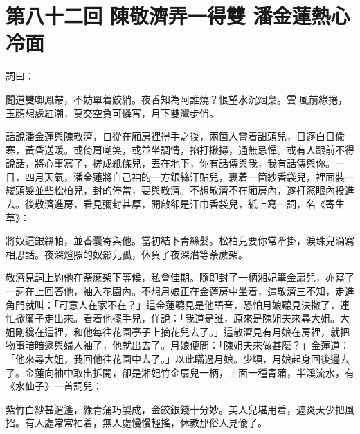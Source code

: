 
\chapter*{第八十二回 陳敬濟弄一得雙 潘金蓮熱心冷面}


詞曰：

\begin{myquote}
聞道雙啣鳳帶，不妨單着鮫綃。夜香知為阿誰燒？悵望水沉烟梟。雲𩬆風前綠捲，玉顏想處紅潮，莫交空負可憐宵，月下雙灣步俏。

\end{myquote}

話說潘金蓮與陳敬濟，自從在廂房裡得手之後，兩箇人嘗着甜頭兒，日逐白日偸寒，黃昏送暖。或倚肩嘲笑，或並坐調情，掐打揪撏，通無忌憚。或有人跟前不得說話，將心事寫了，搓成紙條兒，丟在地下，你有話傳與我，我有話傳與你。一日，四月天氣，潘金蓮將自己袖的一方銀絲汗貼兒，裹着一箇紗香袋兒，裡面裝一縷頭髮並些松柏兒，封的停當，要與敬濟。不想敬濟不在廂房內，遂打窓眼內投進去。後敬濟進房，看見彌封甚厚，開啟卻是汗巾香袋兒，紙上寫一詞，名《寄生草》：

\begin{myquote}
將奴這銀絲帕，並香囊寄與他。當初結下青絲髮。松柏兒要你常牽掛，淚珠兒滴寫相思話。夜深燈照的奴影兒孤，休負了夜深潛等荼䕷架。
\end{myquote}

敬濟見詞上約他在荼䕷架下等候，私會佳期。隨即封了一柄湘妃筆金扇兒，亦寫了一詞在上回答他，袖入花園內。不想月娘正在金蓮房中坐着，這敬濟三不知，走進角門就叫：「可意人在家不在？」這金蓮聽見是他語音，恐怕月娘聽見決撒了，連忙掀簾子走出來。看着他擺手兒，佯說：「我道是誰，原來是陳姐夫來尋大姐。大姐剛纔在這裡，和他每往花園亭子上摘花兒去了。」{}這敬濟見有月娘在房裡，就把物事暗暗遞與婦人袖了，他就出去了。月娘便問：「陳姐夫來做甚麼？」金蓮道：「他來尋大姐，我回他往花園中去了。」以此瞞過月娘。少頃，月娘起身回後邊去了。金蓮向袖中取出拆開，卻是湘妃竹金扇兒一柄，上面一種青蒲，半溪流水，有《水仙子》一首詞兒：

\begin{myquote}
紫竹白紗甚逍遙，綠青蒲巧製成，金鉸銀錢十分妙。美人兒堪用着，遮炎天少把風招。有人處常常袖着，無人處慢慢輕搖，休教那俗人見偸了。{}
\end{myquote}

